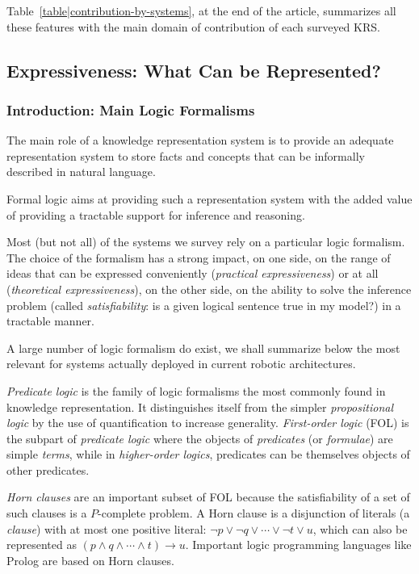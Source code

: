 \documentclass[a4paper, twocolumn]{article}
\begin{document}
Table~\ref{table|contribution-by-systems}, at the end of the article,
summarizes all these features with the main domain of contribution of each
surveyed KRS.

\subsection{Expressiveness: What Can be Represented?}
\label{sect|expressiveness}

\subsubsection{Introduction: Main Logic Formalisms}

The main role of a knowledge representation system is to provide an adequate
representation system to store facts and concepts that can be informally
described in natural language.

Formal logic aims at providing such a representation system with the added
value of providing a tractable support for inference and reasoning.

Most (but not all) of the systems we survey rely on a particular logic
formalism. The choice of the formalism has a strong impact, on one side, on the
range of ideas that can be expressed conveniently (\emph{practical
expressiveness}) or at all (\emph{theoretical expressiveness}), on the other
side, on the ability to solve the inference problem (called
\emph{satisfiability}: is a given logical sentence true in my model?) in a
tractable manner.

A large number of logic formalism do exist, we shall summarize below the most
relevant for systems actually deployed in current robotic architectures.

\emph{Predicate logic} is the family of logic formalisms the most commonly
found in knowledge representation. It distinguishes itself from the simpler
\emph{propositional logic} by the use of quantification to increase generality.
\emph{First-order logic} (FOL) is the subpart of \emph{predicate logic} where the
objects of \emph{predicates} (or \emph{formulae}) are simple \emph{terms},
while in \emph{higher-order logics}, predicates can be themselves objects of
other predicates.

\emph{Horn clauses} are an important subset of FOL because the satisfiability
of a set of such clauses is a $P$-complete problem. A Horn clause is a
disjunction of literals (a \emph{clause}) with at most one positive literal:
$\neg p \vee \neg q \vee \cdots \vee \neg t \vee u$, which can also be
represented as $(p \wedge q \wedge \cdots \wedge t) \rightarrow u$.  Important
logic programming languages like Prolog are based on Horn clauses.
\end{document}
